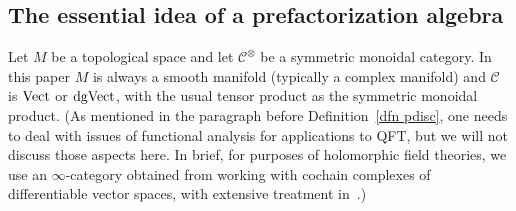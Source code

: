 \documentclass[11pt]{amsart}
\def\mc{\mathcal}
\begin{document}
\subsection{The essential idea of a prefactorization algebra}

Let $M$ be a topological space and let $\mc{C}^\otimes$ be a symmetric monoidal category. 
In this paper $M$ is always a smooth manifold (typically a complex manifold) and $\mc{C}$ is ${\rm Vect}$ or ${\rm dgVect}$, with the usual tensor product as the symmetric monoidal product.
(As mentioned in the paragraph before Definition~\ref{dfn pdisc}, one needs to deal with issues of functional analysis for applications to QFT, but we will not discuss those aspects here.
In brief, for purposes of holomorphic field theories, we use an $\infty$-category obtained from working with cochain complexes of differentiable vector spaces, with extensive treatment in~\cite{CG1}.)
\end{document}
